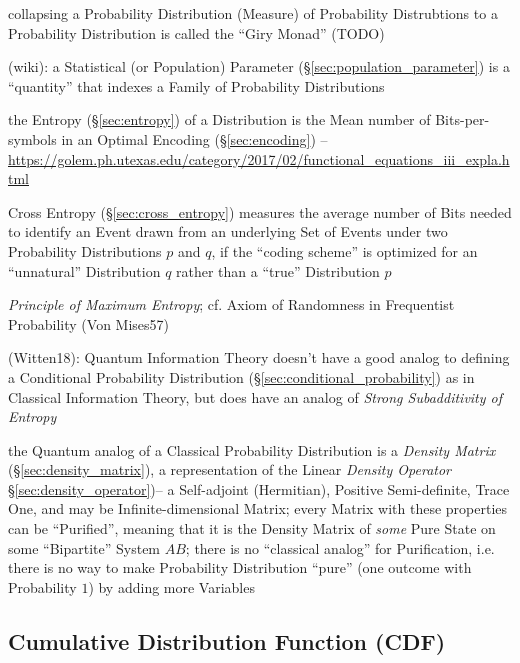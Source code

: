 collapsing a Probability Distribution (Measure) of Probability Distrubtions to a
Probability Distribution is called the ``Giry Monad'' (TODO)

(wiki): a Statistical (or Population) Parameter
(\S\ref{sec:population_parameter}) is a ``quantity'' that indexes a Family of
Probability Distributions

the Entropy (\S\ref{sec:entropy}) of a Distribution is the Mean number
of Bits-per-symbols in an Optimal Encoding (\S\ref{sec:encoding}) --
\url{https://golem.ph.utexas.edu/category/2017/02/functional_equations_iii_expla.html}

Cross Entropy (\S\ref{sec:cross_entropy}) measures the average number of Bits
needed to identify an Event drawn from an underlying Set of Events under two
Probability Distributions $p$ and $q$, if the ``coding scheme'' is optimized for
an ``unnatural'' Distribution $q$ rather than a ``true'' Distribution $p$

\emph{Principle of Maximum Entropy}; cf. Axiom of Randomness in Frequentist
Probability (Von Mises57)

(Witten18): Quantum Information Theory doesn't have a good analog to defining a
Conditional Probability Distribution (\S\ref{sec:conditional_probability}) as in
Classical Information Theory, but does have an analog of \emph{Strong
  Subadditivity of Entropy}

the Quantum analog of a Classical Probability Distribution is a \emph{Density
  Matrix} (\S\ref{sec:density_matrix}), a representation of the Linear
\emph{Density Operator} \S\ref{sec:density_operator})-- a Self-adjoint
(Hermitian), Positive Semi-definite, Trace One, and may be Infinite-dimensional
Matrix; every Matrix with these properties can be ``Purified'', meaning that it
is the Density Matrix of \emph{some} Pure State on some ``Bipartite'' System
$AB$; there is no ``classical analog'' for Purification, i.e. there is no way to
make Probability Distribution ``pure'' (one outcome with Probability $1$) by
adding more Variables



\subsection{Cumulative Distribution Function (CDF)}\label{sec:cdf}

